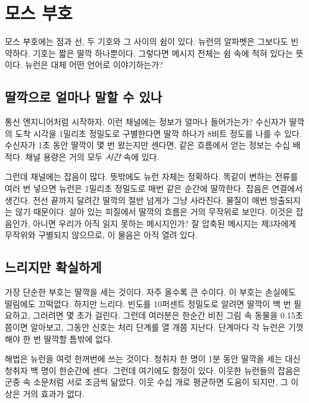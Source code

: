 \chapter{모스 부호}

모스 부호에는 점과 선, 두 기호와 그 사이의 쉼이 있다. 뉴런의 알파벳은 그보다도 빈약하다. 기호는 짧은 딸깍 하나뿐이다. 그렇다면 메시지 전체는 쉼 속에 적혀 있다는 뜻이다. 뉴런은 대체 어떤 언어로 이야기하는가?

\section*{딸깍으로 얼마나 말할 수 있나}

통신 엔지니어처럼 시작하자. 이런 채널에는 정보가 얼마나 들어가는가? 수신자가 딸깍의 도착 시각을 1밀리초 정밀도로 구별한다면 딸깍 하나가 8비트 정도를 나를 수 있다. 수신자가 1초 동안 딸깍이 몇 번 왔는지만 센다면, 같은 흐름에서 얻는 정보는 수십 배 적다. 채널 용량은 거의 모두 \emph{시간} 속에 있다.


그런데 채널에는 잡음이 많다. 뜻밖에도 뉴런 자체는 정확하다. 똑같이 변하는 전류를 여러 번 넣으면 뉴런은 1밀리초 정밀도로 매번 같은 순간에 딸깍한다. 잡음은 연결에서 생긴다. 전선 끝까지 달려간 딸깍의 절반 넘게가 그냥 사라진다. 물질이 매번 방출되지는 않기 때문이다. 살아 있는 피질에서 딸깍의 흐름은 거의 무작위로 보인다. 이것은 잡음인가, 아니면 우리가 아직 읽지 못하는 메시지인가? 잘 압축된 메시지는 제3자에게 무작위와 구별되지 않으므로, 이 물음은 아직 열려 있다.

\section*{느리지만 확실하게}

가장 단순한 부호는 딸깍을 세는 것이다. 자주 올수록 큰 수이다. 이 부호는 손실에도 떨림에도 끄떡없다. 하지만 느리다. 빈도를 10퍼센트 정밀도로 알려면 딸깍이 백 번 필요하고, 그러려면 몇 초가 걸린다. 그런데 여러분은 한순간 비친 그림 속 동물을 0.15초쯤이면 알아보고, 그동안 신호는 처리 단계를 열 개쯤 지난다. 단계마다 각 뉴런은 기껏해야 한 번 딸깍할 틈밖에 없다.

해법은 뉴런을 여럿 한꺼번에 쓰는 것이다. 청취자 한 명이 1분 동안 딸깍을 세는 대신 청취자 백 명이 한순간에 센다. 그런데 여기에도 함정이 있다. 이웃한 뉴런들의 잡음은 군중 속 소문처럼 서로 조금씩 닮았다. 이웃 수십 개로 평균하면 도움이 되지만, 그 이상은 거의 효과가 없다.

